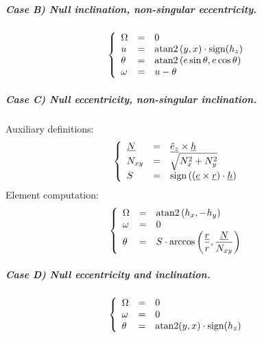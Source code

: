 		\subparagraph{Case B) Null inclination, non-singular eccentricity. \\}
		\[
		\left\{
		\begin{array}{lll}
		\Omega 	& = & 0 \\
		u 		& = & \text{atan2}\left( y, x \right) \cdot \text{sign} (h_z) \\
		\theta 	& = & \text{atan2}\left(e\sin\theta, e\cos\theta\right)\\
		\omega 	& = & u - \theta
		\end{array}\right.
		\]
		\subparagraph{Case C) Null eccentricity, non-singular inclination. \\}
		\indent Auxiliary definitions:
		\[\left\{
		\begin{array}{lll}
		\underline{N} 	& = & \underline{\hat{e}_z} \times \underline{h} \\
		N_{xy} 			& = & \sqrt{N_x^2 + N_y^2} \\
		S 				& = & \text{sign}\left( (\underline{e} \times\underline{r}) \cdot \underline{h} \right)
		\end{array}
		\right.
		\]
		\indent Element computation:
		\[
		\left\{
		\begin{array}{lll}
		\Omega 	& = & \text{atan2}\left( h_x, -h_y\right)\\
		\omega 	& = & 0 \\
		\theta 	& = & S \cdot \arccos\left( \dfrac{\underline{r}}{r}, \dfrac{\underline{N}}{N_{xy}} \right)\\
		\end{array}\right.
		\]
		\subparagraph{Case D) Null eccentricity and inclination. \\}
		\[
		\left\{
		\begin{array}{lll}
		\Omega 	& = & 0 \\
		\omega 	& = & 0 \\
		\theta 	& = & \text{atan2}(y, x) \cdot \text{sign}(h_z)\\
		\end{array}\right.
		\]
